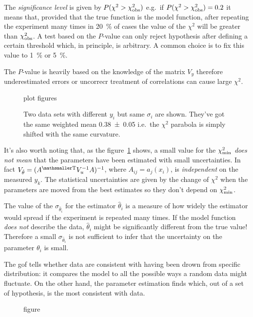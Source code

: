 \documentclass[
	10pt,
	draft
]{scrreprt}
\newcommand{\transpose}[1]{\ensuremath{#1}^{\mathrm{ \mathsmaller T}}}
\begin{document}
The \emph{significance level} is given by $P(\chi^2 > \chi^2_\textup{obs})$ e.g.~if $P(\chi^2 > \chi^2_\textup{obs}) = \num{.2}$ it means that, provided that the true function is the model function, after repeating the experiment many times in \SI{20}{\percent} of cases the value of the $\chi^2$ will be greater than $\chi^2_\textup{obs}$.
A test based on the $P$-value can only reject hypothesis after defining a certain threshold which, in principle, is arbitrary.
A common choice is to fix this value to \SI{1}{\percent} or \SI{5}{\percent}.



The $P$-value is heavily based on the knowledge of the matrix $V_y$ therefore underestimated errors or uncorrecr treatment of correlations can cause large $\chi^2$.
\begin{figure}
	\centering
\color{red}
plot figures
\caption{Two data sets with different $y_i$ but same $\sigma_i$ are shown. They've got the same weighted mean \num{.38\pm.05} i.e.~the $\chi^2$ parabola is simply shifted with the same curvature.}
	\label{fig:ChiSquareMindBlow}
\end{figure}
It's also worth noting that, as the figure~\ref{fig:ChiSquareMindBlow} shows, a small value for the $\chi^2_\textup{min}$ \emph{does not mean} that the parameters have been estimated with small uncertainties.
In fact $V_{\hat{\theta}} = (\transpose{A}V_u^{-1}A)^{-1}$, where $A_{ij} = a_j(x_i)$, is \emph{independent} on the measured $y_k$.
The statistical uncertainties are given by the change of $\chi^2$ when the parameters are moved from the best estimates so they don't depend on $\chi^2_\textup{min}$.


The value of the $\sigma_{\hat\theta_i}$ for the estimator $\hat\theta_i$ is a measure of how widely the estimator would spread if the experiment is repeated many times.
If the model function \emph{does not} describe the data, $\hat\theta_i$ might be significantly different from the true value!
Therefore a small $\sigma_{\hat\theta_i}$ is not sufficient to infer that the uncertainty on the parameter $\theta_i$ is small.



The \ac{gof} tells whether data are consistent {\color{red}with having been drown} from specific distribution: it compares the model to all the possible ways a random data might fluctuate.
On the other hand, the parameter estimation finds which, out of a set of hypothesis, is the most consistent with data.

\begin{figure}
\color{red}figure
\end{figure}
\end{document}
